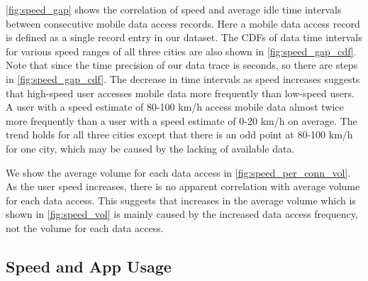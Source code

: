 \autoref{fig:speed_gap} shows the correlation of speed and average idle time intervals between consecutive mobile data access records. Here a mobile data access record is defined as a single record entry in our dataset. The CDFs of data time intervals for various speed ranges of all three cities are also shown in \autoref{fig:speed_gap_cdf}. Note that since the time precision of our data trace is seconds, so there are steps in \autoref{fig:speed_gap_cdf}. The decrease in time intervals as speed increases suggests that high-speed user accesses mobile data more frequently than low-speed users. A user with a speed estimate of 80-100 km/h access mobile data almost twice more frequently than a user with a speed estimate of 0-20 km/h on average. The trend holds for all three cities except that there is an odd point at 80-100 km/h for one city, which may be caused by the lacking of available data.

We show the average volume for each data access in \autoref{fig:speed_per_conn_vol}. As the user speed increases, there is no apparent correlation with average volume for each data access. This suggests that increases in the average volume which is shown in \autoref{fig:speed_vol} is mainly caused by the increased data access frequency, not the volume for each data access.

\subsection{Speed and App Usage}


